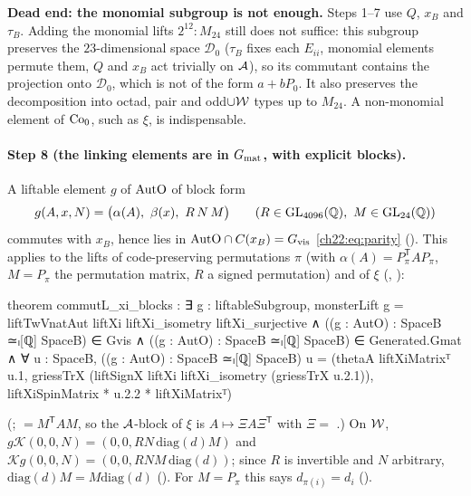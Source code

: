 \begin{warning}
\textbf{Dead end: the monomial subgroup is not enough.}  Steps 1--7 use $Q$, $x_B$
and $\tau_B$.  Adding the monomial lifts $2^{12}{:}M_{24}$ still does not suffice: this subgroup preserves the $23$-dimensional
space $\mathcal D_0$ ($\tau_B$ fixes each $E_{ii}$, monomial elements permute them, $Q$ and $x_B$ act trivially on
$\mathcal{A}$), so its commutant contains the projection onto $\mathcal D_0$, which is not of the form $a+bP_0$.  It also
preserves the decomposition into octad, pair and odd$\cup\mathcal{W}$ types up to $M_{24}$.  A non-monomial element of
$\mathrm{Co}_0$, such as $\xi$, is indispensable.
\end{warning}

\paragraph{Step 8 (the linking elements are in $G_{\mathrm{mat}}$, with explicit blocks).}  A liftable element $g$ of
$\mathrm{AutO}$ of block form
\begin{equation}\label{ch22:eq:blockform}
  g(A,x,N)=\bigl(\alpha(A),\ \beta(x),\ R\,N\,M\bigr)\qquad(R\in\mathrm{GL}_{4096}(\Q),\ M\in\mathrm{GL}_{24}(\Q))
\end{equation}
commutes with $x_B$, hence lies in $\mathrm{AutO}\cap C(x_B)=G_{\mathrm{vis}}$ \eqref{ch22:eq:parity} ().
This applies to the lifts of code-preserving permutations $\pi$ (with $\alpha(A)=P_\pi^{\mathsf T}AP_\pi$, $M=P_\pi$ the permutation
matrix, $R$ a signed permutation) and of $\xi$ (, ):
\begin{leancode}
theorem commutL_xi_blocks :
    ∃ g : liftableSubgroup,
      monsterLift g = liftTwVnatAut liftXi liftXi_isometry liftXi_surjective ∧
      ((g : AutO) : SpaceB ≃ₗ[ℚ] SpaceB) ∈ Gvis ∧
      ((g : AutO) : SpaceB ≃ₗ[ℚ] SpaceB) ∈ Generated.Gmat ∧
      ∀ u : SpaceB, ((g : AutO) : SpaceB ≃ₗ[ℚ] SpaceB) u =
        (thetaA liftXiMatrixᵀ u.1,
          griessTrX (liftSignX liftXi liftXi_isometry (griessTrX u.2.1)),
          liftXiSpinMatrix * u.2.2 * liftXiMatrixᵀ)
\end{leancode}
(;  $=M^{\mathsf T}AM$, so the $\mathcal{A}$-block of $\xi$ is
$A\mapsto\Xi A\Xi^{\mathsf T}$ with $\Xi=$ .)  On $\mathcal{W}$, $g\mathcal K(0,0,N)=(0,0,RN\,\mathrm{diag}(d)M)$ and
$\mathcal Kg(0,0,N)=(0,0,RNM\,\mathrm{diag}(d))$; since $R$ is invertible and $N$ arbitrary, $\mathrm{diag}(d)M=M\mathrm{diag}(d)$
().  For $M=P_\pi$ this says $d_{\pi(i)}=d_i$ ().

